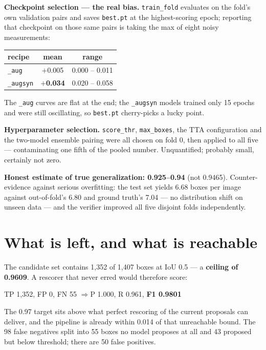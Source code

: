 \documentclass[11pt,a4paper]{article}
\begin{document}
\textbf{Checkpoint selection --- the real bias.} \texttt{train\_fold} evaluates on the fold's own
validation pairs and saves \texttt{best.pt} at the highest-scoring epoch; reporting that
checkpoint on those same pairs is taking the max of eight noisy measurements:

\begin{table}[h!]
\centering
\small
\renewcommand{\arraystretch}{1.25}
\begin{tabular}{@{}lcc@{}}
\toprule
\textbf{recipe} & \textbf{mean} & \textbf{range} \\
\midrule
\texttt{\_aug} & $+$0.005 & 0.000 -- 0.011 \\
\texttt{\_augsyn} & \textbf{$+$0.034} & 0.020 -- 0.058 \\
\bottomrule
\end{tabular}
\end{table}

The \texttt{\_aug} curves are flat at the end; the \texttt{\_augsyn} models trained only 15 epochs
and were still oscillating, so \texttt{best.pt} cherry-picks a lucky point.

\textbf{Hyperparameter selection.} \texttt{score\_thr}, \texttt{max\_boxes}, the TTA configuration
and the two-model ensemble pairing were all chosen on fold 0, then applied to all five ---
contaminating one fifth of the pooled number. Unquantified; probably small, certainly not zero.

\textbf{Honest estimate of true generalization: 0.925--0.94} (not 0.9465). Counter-evidence
against serious overfitting: the test set yields 6.68 boxes per image against out-of-fold's 6.80
and ground truth's 7.04 --- no distribution shift on unseen data --- and the verifier improved all
five disjoint folds independently.

\section{What is left, and what is reachable}

The candidate set contains 1{,}352 of 1{,}407 boxes at IoU 0.5 --- a \textbf{ceiling of 0.9609}.
A rescorer that never erred would therefore score:

\begin{center}
TP 1{,}352,\; FP 0,\; FN 55 \quad$\Rightarrow$\quad P 1.000,\; R 0.961,\; \textbf{F1 0.9801}
\end{center}

The 0.97 target sits above what perfect rescoring of the current proposals can deliver, and the
pipeline is already within 0.014 of that unreachable bound. The 98 false negatives split into 55
boxes no model proposes at all and 43 proposed but below threshold; there are 50 false positives.
\end{document}
